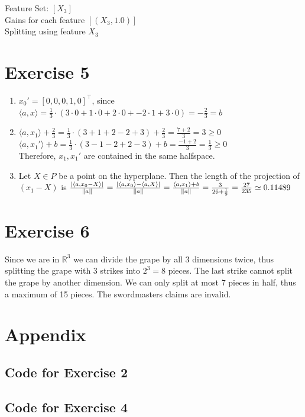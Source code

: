 \documentclass[12pt]{article}
\DeclarePairedDelimiter\abs{\lvert}{\rvert}
\DeclarePairedDelimiter\Abs{\lVert}{\rVert}
\begin{document}
Feature Set: $[X_3]$ \\
Gains for each feature $[(X_3, 1.0)]$ \\
Splitting using feature $X_3$ \\

\section*{Exercise 5}
\begin{enumerate}[label=(\alph*)]
	\item	$x_0' = [0, 0, 0, 1, 0]^\top$, since $\langle a,x \rangle = \frac{1}{3} \cdot (3 \cdot 0 + 1 \cdot 0 + 2 \cdot 0 + -2 \cdot 1 + 3 \cdot 0) = -\frac{2}{3} = b$
	\item	$\langle a,x_1 \rangle + \frac{2}{3} = \frac{1}{3} \cdot (3+1+2-2+3) + \frac{2}{3} = \frac{7+2}{3} = 3 \geq 0$ \\
			$\langle a,x_1' \rangle + b = \frac{1}{3} \cdot (3-1-2+2-3) + b = \frac{-1+2}{3} = \frac{1}{3} \geq 0$ \\
			Therefore, $x_1,x_1'$ are contained in the same halfspace.
	\item	Let $X \in P$ be a point on the hyperplane. Then the length of the projection of $(x_1 - X)$ is $\frac{\abs{\langle a,x_0 - X \rangle}}{\Abs{a}} = \frac{\abs{\langle a,x_0 \rangle - \langle a,X \rangle}}{\Abs{a}} = \frac{\langle a,x_1 \rangle + b}{\Abs{a}} = \frac{3}{26 + \frac{1}{9}} = \frac{27}{235} \simeq 0.11489$
\end{enumerate}

\section*{Exercise 6}
Since we are in $\mathbb{R}^3$ we can divide the grape by all 3 dimensions twice, thus splitting the grape with 3 strikes into $2^3=8$ pieces. The last strike cannot split the grape by another dimension. We can only split at most 7 pieces in half, thus a maximum of 15 pieces. The swordmasters claims are invalid.

\section*{Appendix}\label{appendix}
\subsection*{Code for Exercise 2}


\subsection*{Code for Exercise 4}

\end{document}

